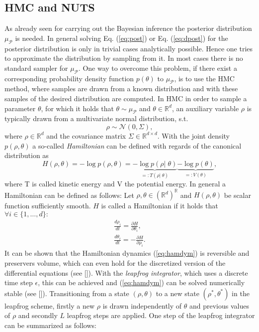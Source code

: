 \documentclass[12pt,letterpaper]{article}
\begin{document}
\subsection{HMC and NUTS}
As already seen for carrying out the Bayesian inference the posterior distribution $\mu_\mathcal{P}$ is needed. In general solving Eq.  (\ref{eq:post}) or Eq. (\ref{eq:dpost}) for the posterior distribution is only in trivial cases analytically possible. Hence one tries to approximate the distribution by sampling from it. In most cases there is no standard sampler for $\mu_\mathcal{P}$. One way to overcome this problem, if there exist a corresponding probability density function $p(\theta)$ to $\mu_\mathcal{P}$, is to use the HMC method, where samples are drawn from a known distribution and with these samples of the desired distribution are computed. In HMC in order to sample a parameter $\theta$, for which it holds that $\theta \sim \mu_\mathcal{P}$ and $\theta \in \mathbb{R}^d$, an auxiliary variable $\rho$ is typically drawn from a multivariate normal distribution, s.t.
\begin{equation}
\rho \sim \mathcal{N}(0,\Sigma), 
\end{equation}
where $\rho \in \mathbb{R}^d$ and the covariance matrix $\Sigma \in \mathbb{R}^{d \times d}$. With the joint density $p(\rho, \theta)$ a so-called \textit{Hamiltonian} can be defined with regards of the canonical distribution as
\begin{equation}
H(\rho, \theta) = -\log p(\rho, \theta) = \underbrace{-\log p(\rho |\; \theta)}_{=:T(\rho |\; \theta)} \underbrace{-\log p(\theta)}_{=:V(\theta)},
\end{equation}
where T is called kinetic energy and V the potential energy. In general a Hamiltonian can be defined as follows:
Let $\rho,\theta \in (\mathbb{R}^d)^\mathbb{R}$ and $H(\rho,\theta)$ be scalar function sufficiently smooth.
$H$ is called a Hamiltonian if it holds that $\forall i \in \{1,\dots,d\}:$
\begin{equation}
\label{eq:hamdym}
\begin{aligned}
\frac{d \rho_i }{dt} = \frac{\partial H}{\partial \theta_i}, \\
\frac{d \theta_i }{dt} = -\frac{\partial H}{\partial \rho_i}.
\end{aligned}
\end{equation}
It can be shown that the Hamiltonian dynamics (\ref{eq:hamdym}) is reversible and preservers volume, which can even hold for the discretized version of the differential equations (see [\cite{mcmchb}]). With the \textit{leapfrog integrator}, which uses a discrete time step $\epsilon$, this can be achieved and (\ref{eq:hamdym}) can be solved numerically stable (see [\cite{mcmchb}]). Transitioning from a state $(\rho, \theta)$ to a new state $(\rho^*,\theta^*)$ in the leapfrog scheme, firstly a new  $\rho$ is drawn independently of $\theta$ and previous values of $\rho$ and secondly $L$ leapfrog steps are applied. One step of the leapfrog integrator can be summarized as follows:
\end{document}
